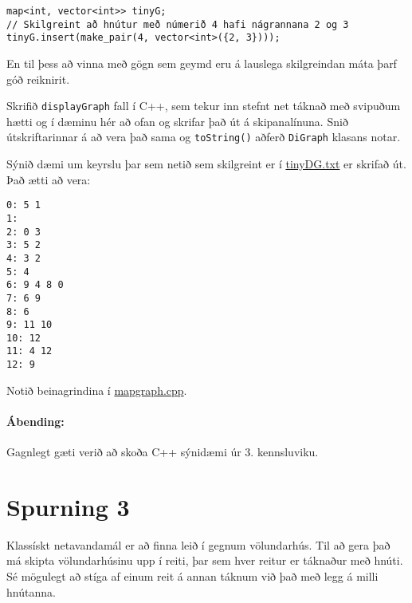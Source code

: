 \documentclass{article}
\begin{document}
\begin{verbatim}
map<int, vector<int>> tinyG;
// Skilgreint að hnútur með númerið 4 hafi nágrannana 2 og 3
tinyG.insert(make_pair(4, vector<int>({2, 3})));
\end{verbatim}

En til þess að vinna með gögn sem geymd eru á lauslega skilgreindan máta þarf góð reiknirit.

Skrifið \texttt{displayGraph} fall í C++, sem tekur inn stefnt net táknað með svipuðum hætti og í dæminu hér að ofan og skrifar það út á skipanalínuna. Snið útskriftarinnar á að vera það sama og \texttt{toString()} aðferð \texttt{DiGraph} klasans notar. 

Sýnið dæmi um keyrslu þar sem netið sem skilgreint er í \href{https://github.com/Ernir/kennsluefni/tree/master/T2/Code/w10/tinyDG.txt}{tinyDG.txt} er skrifað út. Það ætti að vera:

\begin{verbatim}
0: 5 1 
1: 
2: 0 3 
3: 5 2 
4: 3 2 
5: 4 
6: 9 4 8 0 
7: 6 9 
8: 6 
9: 11 10 
10: 12 
11: 4 12 
12: 9
\end{verbatim}

Notið beinagrindina í \href{https://github.com/Ernir/kennsluefni/tree/master/T2/Code/w11/mapgraph.cpp}{mapgraph.cpp}.

\paragraph{Ábending:} Gagnlegt gæti verið að skoða C++ sýnidæmi úr 3. kennsluviku.


\section{Spurning 3}
Klassískt netavandamál er að finna leið í gegnum völundarhús. Til að gera það má skipta völundarhúsinu upp í reiti, þar sem hver reitur er táknaður með hnúti. Sé mögulegt að stíga af einum reit á annan táknum við það með legg á milli hnútanna. 
\end{document}
